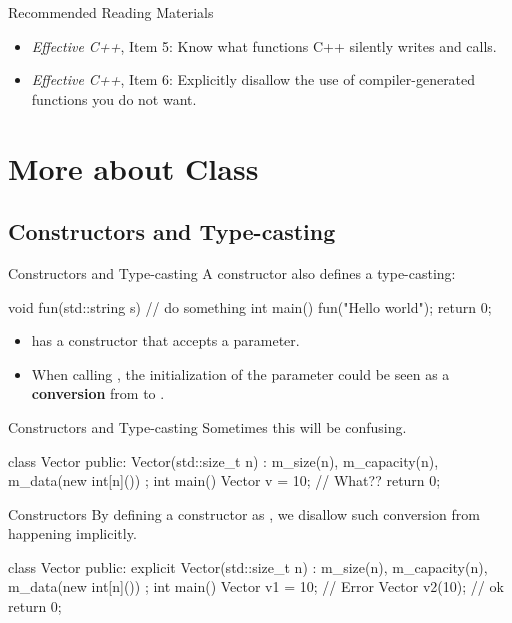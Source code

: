 \documentclass{beamer}
\begin{document}
\begin{frame}{Recommended Reading Materials}
    \begin{itemize}
        \item \textit{Effective C++}, Item 5: Know what functions C++ silently writes and calls.
        \item \textit{Effective C++}, Item 6: Explicitly disallow the use of compiler-generated functions you do not want.
    \end{itemize}
\end{frame}

\section{More about Class}

\subsection{Constructors and Type-casting}

\begin{frame}[fragile]{Constructors and Type-casting}
    A constructor also defines a type-casting:
    \begin{cpp}
void fun(std::string s) {
  // do something
}
int main() {
  fun("Hello world");
  return 0;
}
    \end{cpp}
    \begin{itemize}
        \item {} has a constructor that accepts a \ttt{*} parameter.
        \item When calling , the initialization of the parameter could be seen as a \textbf{conversion} from \ttt{*} to .
    \end{itemize}
\end{frame}

\begin{frame}[fragile]{Constructors and Type-casting}
    Sometimes this will be confusing.
    \begin{cpp}
class Vector {
 public:
  Vector(std::size_t n)
    : m_size(n), m_capacity(n),
      m_data(new int[n]()) {}
};
int main() {
  Vector v = 10; // What??
  return 0;
}
    \end{cpp}
\end{frame}

\begin{frame}[fragile]{ Constructors}
    By defining a constructor as , we disallow such conversion from happening implicitly.
    \begin{cpp}
class Vector {
 public:
  explicit Vector(std::size_t n)
    : m_size(n), m_capacity(n),
      m_data(new int[n]()) {}
};
int main() {
  Vector v1 = 10; // Error
  Vector v2(10);  // ok
  return 0;
}
    \end{cpp}
\end{frame}
\end{document}
